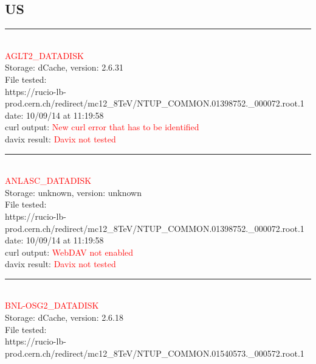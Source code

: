 \subsection{US}

\rule{\textwidth}{1pt}\\

\textcolor{red}{\normalsize{AGLT2\_DATADISK}}\\

Storage: dCache, version: 2.6.31\\

File tested:\\
\footnotesize{https://rucio-lb-prod.cern.ch/redirect/mc12\_8TeV/NTUP\_COMMON.01398752.\_000072.root.1}\\

date: 10/09/14 at 11:19:58\\

curl output:  \textcolor{red}{New curl error that has to be identified}\\

davix result:  \textcolor{red}{Davix not tested}\\

\rule{\textwidth}{1pt}\\

\textcolor{red}{\normalsize{ANLASC\_DATADISK}}\\

Storage: unknown, version: unknown\\

File tested:\\
\footnotesize{https://rucio-lb-prod.cern.ch/redirect/mc12\_8TeV/NTUP\_COMMON.01398752.\_000072.root.1}\\

date: 10/09/14 at 11:19:58\\

curl output:  \textcolor{red}{WebDAV not enabled}\\

davix result:  \textcolor{red}{Davix not tested}\\

\rule{\textwidth}{1pt}\\

\textcolor{red}{\normalsize{BNL-OSG2\_DATADISK}}\\

Storage: dCache, version: 2.6.18\\

File tested:\\
\footnotesize{https://rucio-lb-prod.cern.ch/redirect/mc12\_8TeV/NTUP\_COMMON.01540573.\_000572.root.1}\\

